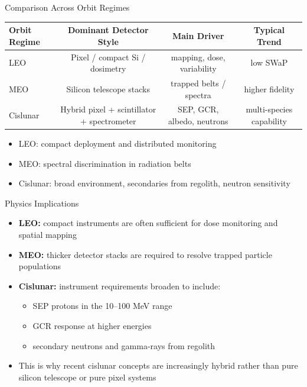 \documentclass[aspectratio=169]{beamer}
\begin{document}
\begin{frame}{Comparison Across Orbit Regimes}
\small
\begin{tabular}{lccc}
\toprule
Orbit Regime & Dominant Detector Style & Main Driver & Typical Trend \\
\midrule
LEO & Pixel / compact Si / dosimetry & mapping, dose, variability & low SWaP \\
MEO & Silicon telescope stacks & trapped belts / spectra & higher fidelity \\
Cislunar & Hybrid pixel + scintillator + spectrometer & SEP, GCR, albedo, neutrons & multi-species capability \\
\bottomrule
\end{tabular}

\vspace{0.5cm}
\begin{itemize}
\item LEO: compact deployment and distributed monitoring
\item MEO: spectral discrimination in radiation belts
\item Cislunar: broad environment, secondaries from regolith, neutron sensitivity
\end{itemize}
\end{frame}

\begin{frame}{Physics Implications}
\small
\begin{itemize}
\item \textbf{LEO:} compact instruments are often sufficient for dose monitoring and spatial mapping
\item \textbf{MEO:} thicker detector stacks are required to resolve trapped particle populations
\item \textbf{Cislunar:} instrument requirements broaden to include:
\begin{itemize}
    \item SEP protons in the 10--100 MeV range
    \item GCR response at higher energies
    \item secondary neutrons and gamma-rays from regolith
\end{itemize}
\item This is why recent cislunar concepts are increasingly hybrid rather than pure silicon telescope or pure pixel systems
\end{itemize}
\end{frame}
\end{document}
